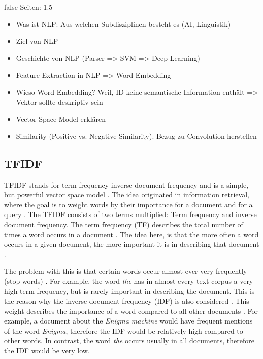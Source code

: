 \documentclass[draft,final,oneside]{vutinfth} %
\begin{document}
\if false
Seiten: 1.5
\begin{itemize}
\item Was ist NLP: Aus welchen Subdisziplinen besteht es (AI, Linguistik)
\item Ziel von NLP
\item Geschichte von NLP (Parser => SVM => Deep Learning)
\item Feature Extraction in NLP => Word Embedding
\item Wieso Word Embedding? Weil, ID keine semantische Information enthält => Vektor sollte deskriptiv sein
\item Vector Space Model erklären
\item Similarity (Positive vs. Negative Similarity). Bezug zu Convolution herstellen
\end{itemize}

\fi

\subsection{TFIDF}


TFIDF stands for term frequency inverse document frequency and is a simple, but powerful vector space model \cite{tfidf}. The idea originated in information retrieval, where the goal is to weight words by their importance for a document and for a query \cite{historyinformationretrieval}. The TFIDF consists of two terms multiplied: Term frequency and inverse document frequency. The term frequency (TF) describes the total number of times a word occurs in a document \cite{irsurvey}. The idea here, is that the more often a word occurs in a given document, the more important it is in describing that document \cite{irsurvey}.

The problem with this is that certain words occur almost ever very frequently (stop words) \cite{tfidf}. For example, the word \textit{the} has in almost every text corpus a very high term frequency, but is rarely important in describing the document. This is the reason why the inverse document frequency (IDF) is also considered \cite{tfidf}. This weight describes the importance of a word compared to all other documents \cite{historyinformationretrieval}. For example, a document about the \textit{Enigma machine} would have frequent mentions of the word \textit{Enigma}, therefore the IDF would be relatively high compared to other words. In contrast, the word \textit{the} occurs usually in all documents, therefore the IDF would be very low.
\end{document}
